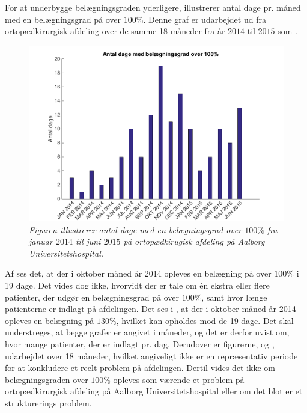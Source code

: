 For at underbygge belægningsgraden yderligere, illustrerer  antal dage pr. måned med en belægningsgrad på over $100 \%$. Denne graf er udarbejdet ud fra ortopædkirurgisk afdeling over de samme 18 måneder fra år $2014$ til $2015$ som . \cite{SDS2015} 

\begin{figure}[H]
	\flushleft 
	\centering
	\includegraphics[scale=.4]{figures/antaldage.png}
	\flushleft
	\caption{\textit{Figuren illustrerer antal dage med en belægningsgrad over $100 \%$ fra januar 			$2014$ til juni $2015$ på ortopædkirugisk afdeling på Aalborg Universitetshospital. 					\cite{SDS2015}}}
	\label{antaldage}
\end{figure}


Af  ses det, at der i oktober måned år 2014 opleves en belægning på over $100 \%$ i 19 dage. Det vides dog ikke, hvorvidt der er tale om én ekstra eller flere patienter, der udgør en belægningsgrad på over $100 \%$, samt hvor længe patienterne er indlagt på afdelingen. Det ses i , at der i oktober måned år 2014 opleves en belægning på $130 \%$, hvilket kan opholdes mod de 19 dage. Det skal understreges, at begge grafer er angivet i måneder, og det er derfor uvist om, hvor mange patienter, der er indlagt pr. dag. Derudover er figurerne,  og , udarbejdet over 18 måneder, hvilket angiveligt ikke er en repræsentativ periode for at konkludere et reelt problem på afdelingen. Dertil vides det ikke om belægningsgraden over $100 \%$ opleves som værende et problem på ortopædkirurgisk afdeling på Aalborg Universitetshospital eller om det blot er et strukturerings problem. 